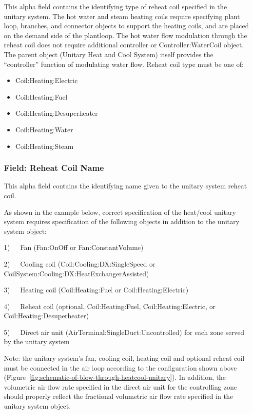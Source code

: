 This alpha field contains the identifying type of reheat coil specified in the unitary system. The hot water and steam heating coils require specifying plant loop, branches, and connector objects to support the heating coils, and are placed on the demand side of the plantloop. The hot water flow modulation through the reheat coil does not require additional controller or Controller:WaterCoil object. The parent object (Unitary Heat and Cool System) itself provides the ``controller'' function of modulating water flow. Reheat coil type must be one of:

\begin{itemize}
\item
  Coil:Heating:Electric
\item
  Coil:Heating:Fuel
\item
  Coil:Heating:Desuperheater
\item
  Coil:Heating:Water
\item
  Coil:Heating:Steam
\end{itemize}

\subsubsection{Field: Reheat Coil Name}\label{field-reheat-coil-name-1-000}

This alpha field contains the identifying name given to the unitary system reheat coil.

As shown in the example below, correct specification of the heat/cool unitary system requires specification of the following objects in addition to the unitary system object:

1)~~~Fan (Fan:OnOff or Fan:ConstantVolume)

2)~~~Cooling coil (Coil:Cooling:DX:SingleSpeed or CoilSystem:Cooling:DX:HeatExchangerAssisted)

3)~~~Heating coil (Coil:Heating:Fuel or Coil:Heating:Electric)

4)~~~Reheat coil (optional, Coil:Heating:Fuel, Coil:Heating:Electric, or Coil:Heating:Desuperheater)

5)~~~Direct air unit (AirTerminal:SingleDuct:Uncontrolled) for each zone served by the unitary system

Note: the unitary system's fan, cooling coil, heating coil and optional reheat coil must be connected in the air loop according to the configuration shown above (Figure~\ref{fig:schematic-of-blow-through-heatcool-unitary}). In addition, the volumetric air flow rate specified in the direct air unit for the controlling zone should properly reflect the fractional volumetric air flow rate specified in the unitary system object.


